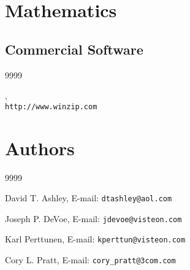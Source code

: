 
\section*{Mathematics}



\subsection*{Commercial Software}

\begin{thecustombibliography}{9999}

, \\
\texttt{http://www.winzip.com}

\end{thecustombibliography}


\section*{Authors}

\begin{thecustombibliography}{9999}

David T. Ashley,
E-mail: \texttt{dtashley@aol.com}

Joseph P. DeVoe,
E-mail: \texttt{jdevoe@visteon.com}

Karl Perttunen,
E-mail: \texttt{kperttun@visteon.com}

Cory L. Pratt,
E-mail: \texttt{cory\_pratt@3com.com}

\end{thecustombibliography}
%

